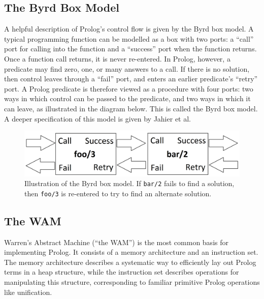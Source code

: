 \documentclass[12pt]{article}
\begin{document}
\subsection{The Byrd Box Model}

A helpful description of Prolog's control flow is given by the Byrd box model. 
A typical programming function can be modelled as a box with two ports: a ``call'' port for calling into the function and a ``success'' port when the function returns. 
Once a function call returns, it is never re-entered.
In Prolog, however, a predicate may find zero, one, or many answers to a call. 
If there is no solution, then control leaves through a ``fail'' port, and enters an earlier predicate's ``retry'' port.
A Prolog predicate is therefore viewed as a procedure with four ports: two ways in which control can be passed to the predicate, and two ways in which it can leave, as illustrated in the diagram below.
This is called the Byrd box model.
A deeper specification of this model is given by Jahier et al. \cite{byrd00}

\vspace{20px}

\begin{figure}[H]
\includegraphics[scale=0.195]{Byrd.png}
\caption{Illustration of the Byrd box model. If \texttt{bar/2} fails to find a solution, then \texttt{foo/3} is re-entered to try to find an alternate solution.}
\end{figure}

\vspace{10px}

\subsection{The WAM}

Warren's Abstract Machine (``the WAM'') is the most common basis for implementing Prolog. 
It consists of a memory architecture and an instruction set. 
The memory architecture describes a systematic way to efficiently lay out Prolog terms in a heap structure, while the instruction set describes operations for manipulating this structure, corresponding to familiar primitive Prolog operations like unification. 
\end{document}
